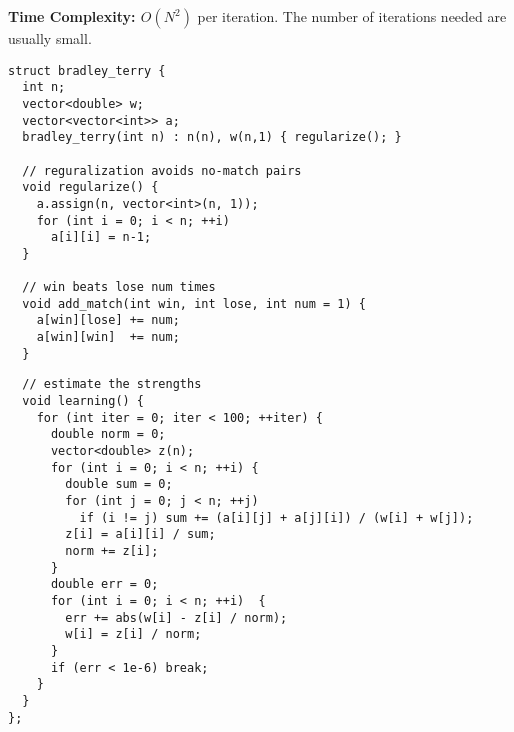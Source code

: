 \textbf{Time Complexity: $O(N^2)$} per iteration. The number of iterations needed are usually small.

\begin{center}
\begin{minipage}[t]{0.45\linewidth}
\begin{lstlisting}
struct bradley_terry {
  int n;
  vector<double> w;
  vector<vector<int>> a;
  bradley_terry(int n) : n(n), w(n,1) { regularize(); }

  // reguralization avoids no-match pairs
  void regularize() {
    a.assign(n, vector<int>(n, 1));
    for (int i = 0; i < n; ++i)
      a[i][i] = n-1;
  }

  // win beats lose num times
  void add_match(int win, int lose, int num = 1) {
    a[win][lose] += num;
    a[win][win]  += num;
  }
\end{lstlisting}
\end{minipage}
\qquad
\begin{minipage}[t]{0.5\linewidth}
\begin{lstlisting}
  // estimate the strengths
  void learning() {
    for (int iter = 0; iter < 100; ++iter) {
      double norm = 0;
      vector<double> z(n);
      for (int i = 0; i < n; ++i) {
        double sum = 0;
        for (int j = 0; j < n; ++j) 
          if (i != j) sum += (a[i][j] + a[j][i]) / (w[i] + w[j]);
        z[i] = a[i][i] / sum;
        norm += z[i];
      }
      double err = 0;
      for (int i = 0; i < n; ++i)  {
        err += abs(w[i] - z[i] / norm);
        w[i] = z[i] / norm;
      }
      if (err < 1e-6) break;
    }
  }
};
\end{lstlisting}
\end{minipage}
\end{center}